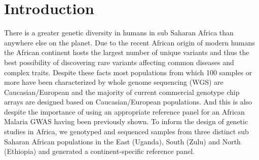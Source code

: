 \section{Introduction}
There is a greater genetic diversity in humans in sub Saharan Africa than anywhere else on the planet.\cite{Bowcock1994}\cite{Jorde1995}\cite{Tishkoff08031996}\cite{Jorde2000}\cite{Stephens2001}\cite{Tishkoff2002}\cite{Tishkoff2004}\cite{HapMap2005}\cite{Ramachandran01112005}\cite{Tishkoff22052009}\cite{1000G2010}\cite{1000G2012} Due to the recent African origin of modern humans the African continent hosts the largest number of unique variants and thus the best possibility of discovering rare variants affecting common diseases and complex traits. Despite these facts most populations from which 100 samples or more have been characterized by whole genome sequencing (WGS) are Caucasian/European and the majority of current commercial genotype chip arrays are designed based on Caucasian/European populations. And this is also despite the importance of using an appropriate reference panel for an African Malaria GWAS having been previously shown.\cite{2009Jallow} To inform the design of genetic studies in Africa, we genotyped and sequenced samples from three distinct sub Saharan African populations in the East (Uganda), South (Zulu) and North (Ethiopia) and generated a continent-specific reference panel.